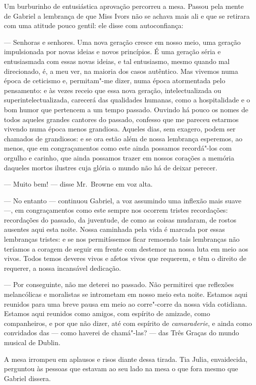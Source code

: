 Um burburinho de entusiástica aprovação percorreu a mesa.  Passou pela mente de
Gabriel a lembrança de que Miss Ivors não se achava mais ali e que se retirara
com uma atitude pouco gentil: ele disse com autoconfiança:

--- Senhoras e senhores.  Uma nova geração cresce em nosso meio, uma geração
impulsionada por novas ideias e novos princípios.  É uma geração séria e
entusiasmada com essas novas ideias, e tal entusiasmo, mesmo quando mal
direcionado, é, a meu ver, na maioria dos casos autêntico.  Mas vivemos numa
época de ceticismo e, permitam"-me dizer, numa época atormentada pelo
pensamento: e às vezes receio que essa nova geração, intelectualizada ou
superintelectualizada, carecerá das qualidades humanas, como a hospitalidade e
o bom humor que pertencem a um tempo passado.  Ouvindo há pouco os nomes de
todos aqueles grandes cantores do passado, confesso que me pareceu estarmos
vivendo numa época menos grandiosa.  Aqueles dias, sem exagero, podem ser
chamados de grandiosos: e se ora estão além de nossa lembrança esperemos, ao
menos, que em congraçamentos como este ainda possamos recordá"-los com orgulho e
carinho, que ainda possamos trazer em nossos corações a memória daqueles mortos
ilustres cuja glória o mundo não há de deixar perecer.

--- Muito bem! --- disse Mr.~Browne em voz alta.

--- No entanto --- continuou Gabriel, a voz assumindo uma inflexão mais suave
---, em congraçamentos como este sempre nos ocorrem tristes recordações:
recordações do passado, da juventude, de como as coisas mudaram, de rostos
ausentes aqui esta noite.  Nossa caminhada pela vida é marcada por essas
lembranças tristes: e se nos permitíssemos ficar remoendo tais lembranças não
teríamos a coragem de seguir em frente com destemor na nossa luta em meio aos
vivos.  Todos temos deveres vivos e afetos vivos que requerem, e têm o direito
de requerer, a nossa incansável dedicação.

--- Por conseguinte, não me deterei no passado.  Não permitirei que reflexões
melancólicas e moralistas se intrometam em nosso meio esta noite.  Estamos aqui
reunidos para uma breve pausa em meio ao corre"-corre da nossa vida cotidiana.
Estamos aqui reunidos como amigos, com espírito de amizade, como companheiros,
e por que não dizer, até com espírito de \textit{camaraderie}, e ainda como
convidados das --- como haverei de chamá"-las? --- das Três Graças do mundo
musical de Dublin.

A mesa irrompeu em aplausos e risos diante dessa tirada.  Tia Julia,
envaidecida, perguntou às pessoas que estavam ao seu lado na mesa o que fora
mesmo que Gabriel dissera.

